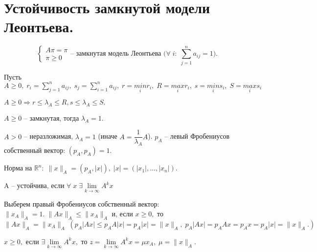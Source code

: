 \chapter{Устойчивость замкнутой модели Леонтьева.}\label{cha:9}

$$\begin{cases}
	A \pi = \pi \\
	\pi \geq 0
\end{cases} \text{-- замкнутая модель Леонтьева (} \forall \; i: \; \sum\limits_{j = 1}^n a_{ij} = 1 \text{).}$$

Пусть $A \geq 0, \; r_i = \sum\limits_{j = 1}^n a_{ij}, \; s_j = \sum\limits_{i = 1}^n a_{ij}, \; r = \underset{i}{min}r_i, \; R = \underset{i}{max}r_i, \; s = \underset{i}{min}s_i, \; S = \underset{i}{max}s_i$

\begin{clair}
	$A \geq 0 \Rightarrow r \leq \lambda_A \leq R, s \leq \lambda_A \leq S.$
\end{clair}

\begin{conseq}
	$A \geq 0$ -- замкнутая, тогда $\lambda_A = 1.$
\end{conseq}

\begin{definition}
	$A > 0$ -- неразложимая, $\lambda_A = 1$ (иначе $A = \dfrac{1}{\lambda_A}A$). $p_A$ -- левый Фробениусов собственный вектор: $(p_A, p_A) = 1.$
\end{definition}

\begin{definition}
	Норма на $\mathbb{R}^n: \; \| x\|_A = (p_A, |x|), \; |x| = (|x_1|, \ldots, |x_n|).$
\end{definition}

\begin{definition}
	A -- устойчива, если $\forall \; x \; \exists \lim\limits_{k \to \infty}A^k x$
\end{definition}

\begin{remark}
	Выберем правый Фробениусов собственный вектор: $\| x_A\|_A = 1. \; \| Ax\|_A \leq \| x_A\|_A$ и, если $x \geq 0,$ то $\| Ax\|_A = \| x_A\|_A \; (p_A |Ax| \leq p_A A |x| = p_A |x| = \| x \|_A, \; p_A |Ax| = p_A A x = p_A x = p_A |x| = \| x\|_A. )$
\end{remark}

\begin{clair}
	$x \geq 0, $ если $\exists \lim\limits_{k \to \infty}A^k x,$ то $z = \lim\limits_{k \to \infty}A^kx = \mu x_A, \; \mu = \| x\|_A.$
\end{clair}

